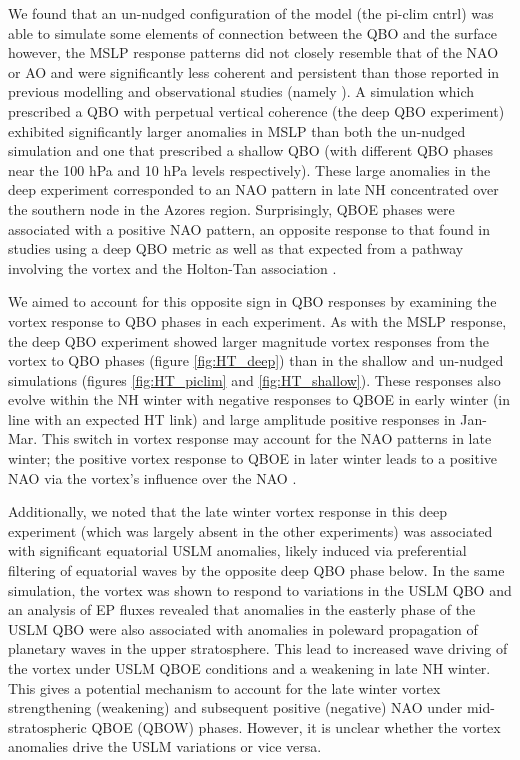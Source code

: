We found that an un-nudged configuration of the model (the pi-clim cntrl) was able to simulate some elements of connection between the QBO and the surface however, the MSLP response patterns did not closely resemble that of the NAO or AO and were significantly less coherent and persistent than those reported in previous modelling and observational studies (namely \cite{andrewsObserved2019d}). A simulation which prescribed a QBO with perpetual vertical coherence (the deep QBO experiment) exhibited significantly larger anomalies in MSLP than both the un-nudged simulation and one that prescribed a shallow QBO (with different QBO phases near the 100 hPa and 10 hPa levels respectively). These large anomalies in the deep experiment corresponded to an NAO pattern in late NH concentrated over the southern node in the Azores region. Surprisingly, QBOE phases were associated with a positive NAO pattern, an opposite response to that found in studies using a deep QBO metric \citep{andrewsObserved2019d} as well as that expected from a pathway involving the vortex and the Holton-Tan association \citep{HoltonJamesRTan1980}.

We aimed to account for this opposite sign in QBO responses by examining the vortex response to QBO phases in each experiment. As with the MSLP response, the deep QBO experiment showed larger magnitude vortex responses from the vortex to QBO phases (figure \ref{fig:HT_deep}) than in the shallow and un-nudged simulations (figures \ref{fig:HT_piclim} and \ref{fig:HT_shallow}). These responses also evolve within the NH winter with negative responses to QBOE in early winter (in line with an expected HT link) and large amplitude positive responses in Jan-Mar. This switch in vortex response may account for the NAO patterns in late winter; the positive vortex response to QBOE in later winter leads to a positive NAO via the vortex's influence over the NAO \citep{charlton-perezInfluence2018e}. 

Additionally, we noted that the late winter vortex response in this deep experiment (which was largely absent in the other experiments) was associated with significant equatorial USLM anomalies, likely induced via preferential filtering of equatorial waves by the opposite deep QBO phase below. In the same simulation, the vortex was shown to respond to variations in the USLM QBO and an analysis of EP fluxes revealed that anomalies in the easterly phase of the USLM QBO were also associated with anomalies in poleward propagation of planetary waves in the upper stratosphere. This lead to increased wave driving of the vortex under USLM QBOE conditions and a weakening in late NH winter. This gives a potential mechanism to account for the late winter vortex strengthening (weakening) and subsequent positive (negative) NAO under mid-stratospheric QBOE (QBOW) phases. However, it is unclear whether the vortex anomalies drive the USLM variations or vice versa.

